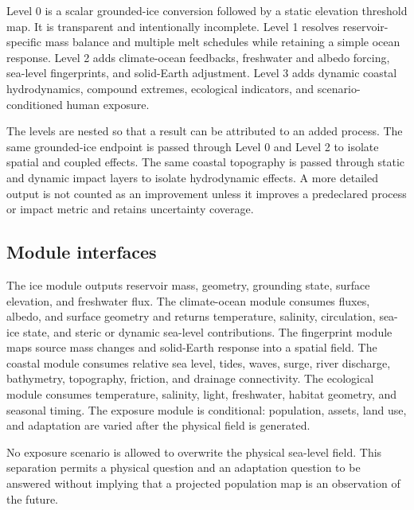 \documentclass[conference]{IEEEtran}
\begin{document}
Level 0 is a scalar grounded-ice conversion followed by a static elevation threshold map. It is transparent and intentionally incomplete. Level 1 resolves reservoir-specific mass balance and multiple melt schedules while retaining a simple ocean response. Level 2 adds climate-ocean feedbacks, freshwater and albedo forcing, sea-level fingerprints, and solid-Earth adjustment. Level 3 adds dynamic coastal hydrodynamics, compound extremes, ecological indicators, and scenario-conditioned human exposure.

The levels are nested so that a result can be attributed to an added process. The same grounded-ice endpoint is passed through Level 0 and Level 2 to isolate spatial and coupled effects. The same coastal topography is passed through static and dynamic impact layers to isolate hydrodynamic effects. A more detailed output is not counted as an improvement unless it improves a predeclared process or impact metric and retains uncertainty coverage.

\subsection{Module interfaces}

The ice module outputs reservoir mass, geometry, grounding state, surface elevation, and freshwater flux. The climate-ocean module consumes fluxes, albedo, and surface geometry and returns temperature, salinity, circulation, sea-ice state, and steric or dynamic sea-level contributions. The fingerprint module maps source mass changes and solid-Earth response into a spatial field. The coastal module consumes relative sea level, tides, waves, surge, river discharge, bathymetry, topography, friction, and drainage connectivity. The ecological module consumes temperature, salinity, light, freshwater, habitat geometry, and seasonal timing. The exposure module is conditional: population, assets, land use, and adaptation are varied after the physical field is generated.

No exposure scenario is allowed to overwrite the physical sea-level field. This separation permits a physical question and an adaptation question to be answered without implying that a projected population map is an observation of the future.
\end{document}
